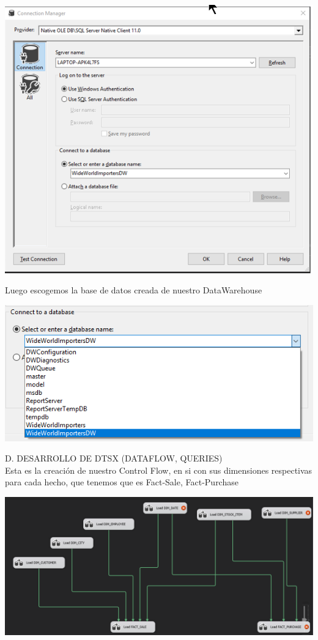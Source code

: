 \documentclass[12pt,letterpaper]{article}
\begin{document}
\begin{center}
\includegraphics[width=17cm]{IMG/31.png} 
\end{center}

Luego escogemos la base de datos creada de nuestro DataWarehouse\\
\begin{center}
\includegraphics[width=17cm]{IMG/32.png} 
\end{center}

D.	DESARROLLO DE DTSX (DATAFLOW, QUERIES)\\
Esta es la creaci\'on de nuestro Control Flow, en si con sus dimensiones respectivas para cada hecho, que tenemos que es Fact-Sale, Fact-Purchase\\

\begin{center}
\includegraphics[width=17cm]{IMG/33.png} 
\end{center}
\end{document}
